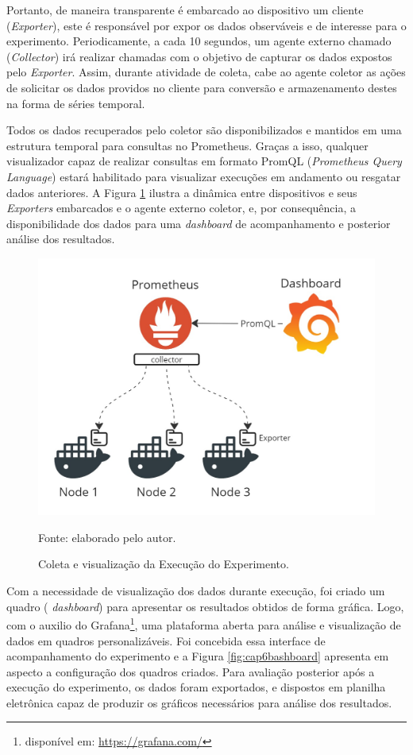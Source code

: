 Portanto, de maneira transparente é embarcado ao dispositivo um cliente (\textit{Exporter}), este é responsável por expor os dados observáveis e de interesse para o experimento. Periodicamente, a cada 10 segundos, um agente externo chamado (\textit{Collector}) irá realizar chamadas com o objetivo de capturar os dados expostos pelo \textit{Exporter}. Assim, durante atividade de coleta, cabe ao agente coletor as ações de solicitar os dados providos no cliente para conversão e armazenamento destes na forma de séries temporal. 

Todos os dados recuperados pelo coletor são disponibilizados e mantidos em uma estrutura temporal para consultas no Prometheus. Graças a isso, qualquer visualizador capaz de realizar consultas em formato PromQL (\textit{Prometheus Query Language}) estará habilitado para visualizar execuções em andamento ou resgatar dados anteriores. A Figura \ref{fig:cap6instrumentalizacao} ilustra a dinâmica entre dispositivos e seus \textit{Exporters} embarcados e o agente externo coletor, e, por consequência, a disponibilidade dos dados para uma \textit{dashboard} de acompanhamento e posterior análise dos resultados. 

\begin{figure}[H]
	\centering
	
	\caption{Coleta e visualização da Execução do Experimento.}
	\label{fig:cap6instrumentalizacao}
	\noindent\includegraphics[width=0.75\linewidth]{Imagens/cap6/cap6instrumentalizacao.jpg} 
	
	Fonte: elaborado pelo autor.
\end{figure}


Com a necessidade de visualização dos dados durante execução, foi criado um quadro ( \textit{dashboard}) para apresentar os resultados obtidos de forma gráfica. Logo, com o auxilio do Grafana\footnote{disponível em: \url{https://grafana.com/}}, uma plataforma aberta para análise e visualização de dados em quadros personalizáveis. Foi concebida essa interface de acompanhamento do experimento e a Figura \ref{fig:cap6bashboard} apresenta em aspecto a configuração dos quadros criados. Para avaliação posterior após a execução do experimento, os dados foram exportados, e dispostos em planilha eletrônica capaz de produzir os gráficos necessários para análise dos resultados. 


